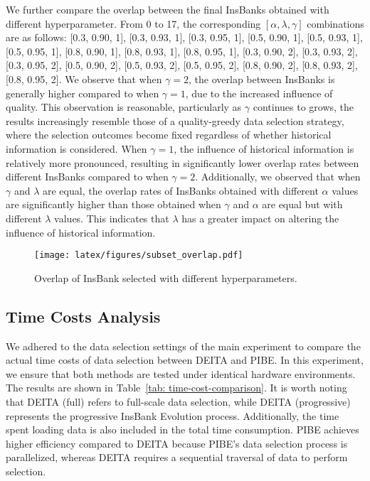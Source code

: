 We further compare the overlap between the final InsBanks obtained with different hyperparameter. From 0 to 17, the corresponding \([ \alpha, \lambda, \gamma ]\) combinations are as follows: [0.3, 0.90, 1], [0.3, 0.93, 1], [0.3, 0.95, 1], [0.5, 0.90, 1], [0.5, 0.93, 1], [0.5, 0.95, 1], [0.8, 0.90, 1], [0.8, 0.93, 1], [0.8, 0.95, 1], [0.3, 0.90, 2], [0.3, 0.93, 2], [0.3, 0.95, 2], [0.5, 0.90, 2], [0.5, 0.93, 2], [0.5, 0.95, 2], [0.8, 0.90, 2], [0.8, 0.93, 2], [0.8, 0.95, 2]. We observe that when \(\gamma = 2\), the overlap between InsBanks is generally higher compared to when \(\gamma = 1\), due to the increased influence of quality. This observation is reasonable, particularly as \(\gamma\) continues to grows, the results increasingly resemble those of a quality-greedy data selection strategy, where the selection outcomes become fixed regardless of whether historical information is considered. When \(\gamma = 1\), the influence of historical information is relatively more pronounced, resulting in significantly lower overlap rates between different InsBanks compared to when \(\gamma = 2\). Additionally, we observed that when \(\gamma\) and \(\lambda\) are equal, the overlap rates of InsBanks obtained with different \(\alpha\) values are significantly higher than those obtained when \(\gamma\) and \(\alpha\) are equal but with different \(\lambda\) values. This indicates that \(\lambda\) has a greater impact on altering the influence of historical information.

\begin{figure}[hbtp]
\texttt{[image: latex/figures/subset\_overlap.pdf]}
\caption{Overlap of InsBank selected with different hyperparameters.}
\label{fig: func_compare}
\end{figure}

\subsection{Time Costs Analysis}
\label{appendix: time-cost}

We adhered to the data selection settings of the main experiment to compare the actual time costs of data selection between DEITA and PIBE. In this experiment, we ensure that both methods are tested under identical hardware environments. The results are shown in Table~\ref{tab: time-cost-comparison}. It is worth noting that DEITA (full) refers to full-scale data selection, while DEITA (progressive) represents the progressive InsBank Evolution process. Additionally, the time spent loading data is also included in the total time consumption. PIBE achieves higher efficiency compared to DEITA because PIBE's data selection process is parallelized, whereas DEITA requires a sequential traversal of data to perform selection. 

